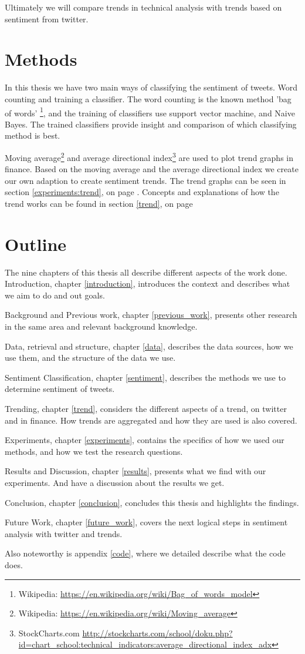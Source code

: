 Ultimately we will compare trends in technical analysis with trends based on
sentiment from twitter. 

\section{Methods}

In this thesis we have two main ways of classifying the sentiment of tweets.
Word counting and training a classifier. The word counting is the known method
'bag of words'
\footnote{Wikipedia: \url{https://en.wikipedia.org/wiki/Bag_of_words_model}},
and the training of classifiers use support vector machine, and Naive Bayes.
The trained classifiers provide insight and comparison of which classifying
method is best.  

Moving average\footnote{Wikipedia:
\url{https://en.wikipedia.org/wiki/Moving_average}} and average directional
index\footnote{StockCharts.com
\url{http://stockcharts.com/school/doku.php?id=chart_school:technical_indicators:average_directional_index_adx}}
are used to plot trend graphs in finance.
Based on the moving average and the average directional index we create our own
adaption to create sentiment trends.  
The trend graphs can be seen in section
\ref{experiments:trend}, on page \pageref{experiments:trend}. Concepts and
explanations of how the trend works can be found in section \ref{trend}, on page \pageref{trend}

\section{Outline}
The nine chapters of this thesis all describe different aspects of the work
done. 
Introduction, chapter \ref{introduction}, introduces the context and describes
what we aim to do and out goals. 

Background and Previous work, chapter \ref{previous_work}, presents other
research in the same area and relevant background knowledge. 

Data, retrieval and structure, chapter \ref{data}, describes the data sources,
how we use them, and the structure of the data we use. 

Sentiment Classification, chapter \ref{sentiment}, describes the methods we use
to determine sentiment of tweets.  

Trending, chapter \ref{trend}, considers the different aspects of a trend, on
twitter and in finance. How trends are aggregated and how they are used is also
covered.  

Experiments, chapter \ref{experiments}, contains the specifics of how we used
our methods, and how we test the research questions.

Results and Discussion, chapter \ref{results}, presents what we find with our
experiments. And have a discussion about the results we get.   

Conclusion, chapter \ref{conclusion}, concludes this thesis and highlights the
findings.  

Future Work, chapter \ref{future_work}, covers the next logical steps in
sentiment analysis with twitter and trends.  

Also noteworthy is appendix \ref{code}, where we detailed describe what the
code does.  
%
